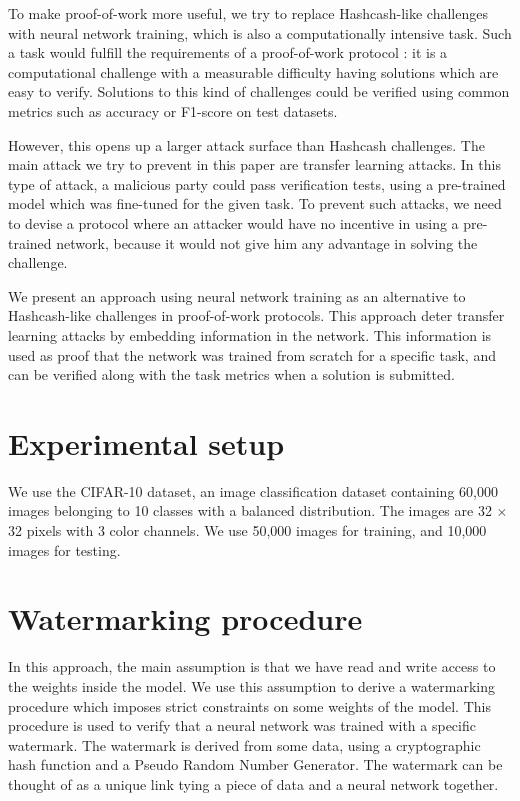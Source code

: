 \documentclass{article}
\begin{document}
\begin{multicols}{2}
	To make proof-of-work more useful, we try to replace Hashcash-like challenges with neural network training, which is also a computationally intensive task. Such a task would fulfill the requirements of a proof-of-work protocol : it is a computational challenge with a measurable difficulty having solutions which are easy to verify. Solutions to this kind of challenges could be verified using common metrics such as accuracy or F1-score on test datasets.

	However, this opens up a larger attack surface than Hashcash challenges. The main attack we try to prevent in this paper are transfer learning attacks. In this type of attack, a malicious party could pass verification tests, using a pre-trained model which was fine-tuned for the given task. To prevent such attacks, we need to devise a protocol where an attacker would have no incentive in using a pre-trained network, because it would not give him any advantage in solving the challenge.

	We present an approach using neural network training as an alternative to Hashcash-like challenges in proof-of-work protocols. This approach deter transfer learning attacks by embedding information in the network. This information is used as proof that the network was trained from scratch for a specific task, and can be verified along with the task metrics when a solution is submitted.

	\section{Experimental setup}

	We use the CIFAR-10 dataset, an image classification dataset containing 60,000 images belonging to 10 classes with a balanced distribution. The images are 32 $ \times $ 32 pixels with 3 color channels. We use 50,000 images for training, and 10,000 images for testing.


	\section{Watermarking procedure}

	In this approach, the main assumption is that we have read and write access to the weights inside the model. We use this assumption to derive a watermarking procedure which imposes strict constraints on some weights of the model. This procedure is used to verify that a neural network was trained with a specific watermark. The watermark is derived from some data, using a cryptographic hash function and a Pseudo Random Number Generator. The watermark can be thought of as a unique link tying a piece of data and a neural network together.


\end{multicols}
\end{document}
